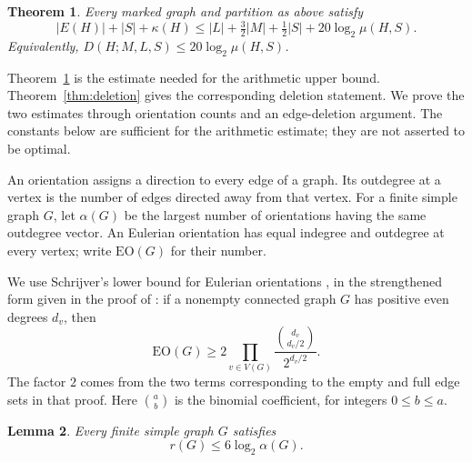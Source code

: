\documentclass[11pt]{article}
\numberwithin{equation}{section}
\newtheorem{theorem}{Theorem}[section]
\newtheorem{lemma}[theorem]{Lemma}
\theoremstyle{remark}
\begin{document}
\begin{theorem}\label{thm:edge}
Every marked graph and partition as above satisfy
\begin{equation}\label{eq:edge}
|E(H)|+|S|+\kappa(H)\le|L|+\tfrac32|M|+\tfrac12|S|+20\log_2\mu(H,S).
\end{equation}
Equivalently, $D(H;M,L,S)\le20\log_2\mu(H,S)$.
\end{theorem}

Theorem~\ref{thm:edge} is the estimate needed for the arithmetic upper bound. Theorem~\ref{thm:deletion} gives the corresponding deletion statement. We prove the two estimates through orientation counts and an edge-deletion argument. The constants below are sufficient for the arithmetic estimate; they are not asserted to be optimal.

An orientation assigns a direction to every edge of a graph. Its outdegree at a vertex is the number of edges directed away from that vertex. For a finite simple graph $G$, let $\alpha(G)$ be the largest number of orientations having the same outdegree vector. An Eulerian orientation has equal indegree and outdegree at every vertex; write $\mathrm{EO}(G)$ for their number.

We use Schrijver's lower bound for Eulerian orientations \cite{Schrijver}, in the strengthened form given in the proof of \cite[Theorem~1.1]{BC}: if a nonempty connected graph $G$ has positive even degrees $d_v$, then
\begin{equation}\label{eq:schrijver}
\mathrm{EO}(G)\ge2\prod_{v\in V(G)}\frac{\binom{d_v}{d_v/2}}{2^{d_v/2}}.
\end{equation}
The factor $2$ comes from the two terms corresponding to the empty and full edge sets in that proof. Here $\binom ab$ is the binomial coefficient, for integers $0\le b\le a$.

\begin{lemma}\label{lem:orient}
Every finite simple graph $G$ satisfies
\[
r(G)\le6\log_2\alpha(G).
\]
\end{lemma}
\end{document}
